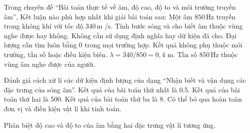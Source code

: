 \begin{ex}
Trong chuyên đề “Bài toán thực tế về âm, độ cao, độ to và môi trường truyền âm”, Kết luận nào phù hợp nhất khi giải bài toán sau: Một âm $850\,\text{Hz}$ truyền trong không khí với tốc độ $340\,\text{m}$ /s. Tính bước sóng và cho biết âm thuộc vùng nghe được hay không.
\choice
{Không cần sử dụng định nghĩa hay dữ kiện đã cho.}
{Đại lượng cần tìm luôn bằng 0 trong mọi trường hợp.}
{Kết quả không phụ thuộc môi trường, tần số hoặc điều kiện biên.}
{\True $\lambda=340/850=0,4$ m. Tần số $850\,\text{Hz}$ thuộc vùng âm nghe được của người.}
\end{ex}

\begin{ex}
Đánh giá cách xử lí các dữ kiện định lượng của dạng “Nhận biết và vận dụng các đặc trưng của sóng âm”.
\choiceTF
{\True Kết quả của bài toán thứ nhất là 0.5.}
{\True Kết quả của bài toán thứ hai là 500.}
{\True Kết quả của bài toán thứ ba là 8.}
{Có thể bỏ qua hoàn toàn đơn vị và điều kiện vật lí khi tính toán.}
\end{ex}

\begin{ex}
Phân biệt độ cao và độ to của âm bằng hai đặc trưng vật lí tương ứng.
\choiceTF

\end{ex}


